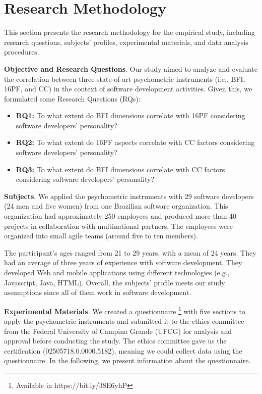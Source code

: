 \section{Research Methodology}
\label{Empirical Study}

This section presents the research methodology for the empirical study, including research questions, subjects' profiles, experimental materials, and data analysis procedures.

\textbf{Objective and Research Questions}. Our study aimed to analyze and evaluate the correlation between three state-of-art psychometric instruments (i.e., BFI, 16PF, and CC) in the context of software development activities. Given this, we formulated some Research Questions (RQs):

\begin{itemize}
    \item {\bfseries RQ1:} To what extent do BFI dimensions correlate with 16PF  considering software developers' personality?
    \item {\bfseries RQ2:} To what extent do 16PF aspects correlate with CC factors considering software developers' personality?
    \item {\bfseries RQ3:} To what extent do BFI dimensions correlate with CC factors considering software developers' personality?
 \end{itemize}
 
\textbf{Subjects}. We applied the psychometric instruments with 29 software developers (24 men and five women) from one Brazilian software organization. This organization had approximately 250 employees and produced more than 40 projects in collaboration with multinational partners. The employees were organized into small agile teams (around five to ten members).

The participant's ages ranged from 21 to 29 years, with a mean of 24 years. They had an average of three years of experience with software development. They developed Web and mobile applications using different technologies (e.g., Javascript, Java, HTML). Overall, the subjects' profile meets our study assumptions since all of them work in software development.

\textbf{Experimental Materials}. We created a questionnaire \footnote{Available in https://bit.ly/38E6yhP} with five sections to apply the psychometric instruments and submitted it to the ethics committee from the Federal University of Campina Grande (UFCG) for analysis and approval before conducting the study. The ethics committee gave us the certification (02505718.0.0000.5182), meaning we could collect data using the questionnaire. In the following, we present information about the questionnaire.

